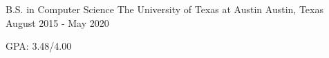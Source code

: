 


\begin{cventries}


\cventry
{B.S. in Computer Science} %
{The University of Texas at Austin} %
{Austin, Texas} %
{August 2015 - May 2020} %
{ %
\begin{cvitems}
\item{GPA: 3.48/4.00}
\end{cvitems}
}


\end{cventries}